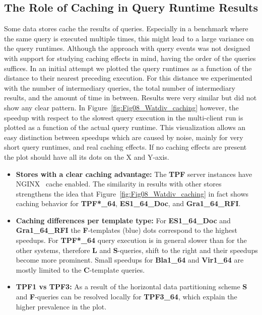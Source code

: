 \documentclass[twocolumn]{bmcart}%
\begin{document}
\subsection{The Role of Caching in Query Runtime Results}
\label{subsec:caching}
%

%



Some data stores cache the results of queries. Especially in a benchmark where the same query is executed multiple times, this might lead to a large variance on the query runtimes. Although the approach with query events was not designed with support for studying caching effects in mind, having the order of the queries suffices. 
In an initial attempt we plotted the query runtimes as a function of the distance to their nearest preceding execution. For this distance we experimented with the number of intermediary queries, the total number of intermediary results, and the amount of time in between. Results were very similar but did not show any clear pattern. 
In Figure~\ref{fig:Fig08_Watdiv_caching} however, the speedup with respect to the slowest query execution in the multi-client run is plotted as a function of the actual query runtime. This visualization allows an easy distinction between speedups which are caused by noise, mainly for very short query runtimes, and real caching effects. If no caching effects are present the plot should have all its dots on the X and Y-axis.
\begin{itemize}
	\item \textbf{Stores with a clear caching advantage:} The \textbf{TPF} server instances have NGINX~\cite{nginx} cache enabled. The similarity in results with other stores strengthens the idea that Figure~\ref{fig:Fig08_Watdiv_caching} in fact shows caching behavior for \textbf{TPF*\_64}, \textbf{ES1\_64\_Doc}, and \textbf{Gra1\_64\_RFI}.
	
	\item \textbf{Caching differences per template type:} For \textbf{ES1\_64\_Doc} and \textbf{Gra1\_64\_RFI} the \textbf{F}-templates (blue) dots correspond to the highest speedups. For \textbf{TPF*\_64} query execution is in general slower than for the other systems, therefore \textbf{L} and \textbf{S}-queries, shift to the right and their speedups become more prominent. Small speedups for \textbf{Bla1\_64} and \textbf{Vir1\_64} are mostly limited to the \textbf{C}-template queries.
	\item \textbf{TPF1 vs TPF3:} As a result of the horizontal data partitioning scheme \textbf{S} and \textbf{F}-queries can be resolved locally for \textbf{TPF3\_64}, which explain the higher prevalence in the plot.
\end{itemize}
\end{document}
